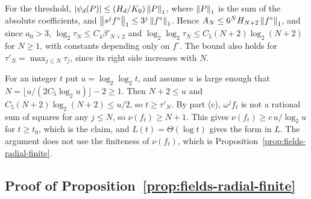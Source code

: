 For the threshold, $|\psi_d(P)|\le(H_d/K_0)\left\lVert P\right\rVert_1$, where $\left\lVert P\right\rVert_1$ is
the sum of the absolute coefficients, and $\left\lVert s^jf^\circ\right\rVert_1\le
3^j\left\lVert f^\circ\right\rVert_1$. Hence $A_N\le6^NH_{N+2}\left\lVert f^\circ\right\rVert_1$, and since
$a_0>3$,
$\log_2\tau_N\le C_4\beta'_{N+2}$ and
$\log_2\log_2\tau_N\le C_5(N+2)\log_2(N+2)$ for $N\ge1$, with constants
depending only on $f^\circ$. The bound also holds for
$\tau'_N=\max_{j\le N}\tau_j$, since its right side increases with $N$.

For an integer $t$ put $u=\log_2\log_2t$, and assume $u$ is large enough
that $N=\lfloor u/(2C_5\log_2u)\rfloor-2\ge1$. Then $N+2\le u$ and
$C_5(N+2)\log_2(N+2)\le u/2$, so $t\ge\tau'_N$. By part (c), $\omega^jf_t$ is
not a rational sum of squares for any $j\le N$, so $\nu(f_t)\ge N+1$. This
gives $\nu(f_t)\ge c\,u/\log_2u$ for $t\ge t_0$, which is the claim, and
$L(t)=\Theta(\log t)$ gives the form in $L$. The argument does not use the
finiteness of $\nu(f_t)$, which is Proposition~\ref{prop:fields-radial-finite}.

\subsection{Proof of Proposition~\ref{prop:fields-radial-finite}}
\label{app:fields-radial-finite}

